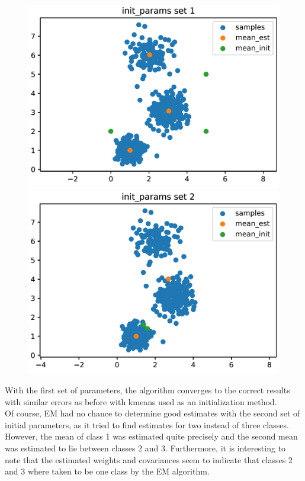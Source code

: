 \documentclass[DIV=12, ngerman, fontsize=12pt, parskip=half]{scrreprt}
\begin{document}
	\begin{figure}[H]
		\begin{minipage}[b]{0.5\textwidth}
			\includegraphics[width=\textwidth]{Task2_initparams_set1_png}
		\end{minipage}
		\begin{minipage}[b]{0.5\textwidth}
			\includegraphics[width=\textwidth]{Task2_initparams_set2_png}
		\end{minipage}
	\end{figure}
	With the first set of parameters, the algorithm converges to the correct results with similar errors as before with kmeans used as an initialization method. \\
	Of course, EM had no chance to determine good estimates with the second set of initial parameters, as it tried to find estimates for two instead of three classes. However, the mean of class 1 was estimated quite precisely and the second mean was estimated to lie between classes 2 and 3. Furthermore, it is interesting to note that the estimated weights and covariances seem to indicate that classes 2 and 3 where taken to be one class by the EM algorithm. \\
\end{document}
